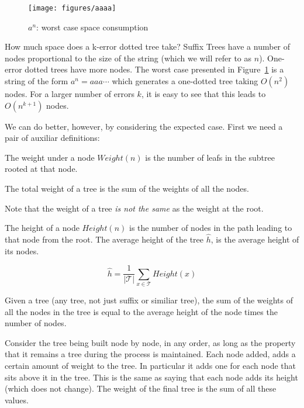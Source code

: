 \begin{figure}
\texttt{[image: figures/aaaa]}
\caption{$a^n$: worst case space consumption}%
\label{fig:aaaa}
\end{figure}

How much space does a k-error dotted tree take? Suffix Trees have a number of nodes proportional to the size of the string (which we will refer to as $n$). One-error dotted trees have more nodes. The worst case presented in Figure~\ref{fig:aaaa} is a string of the form $a^n = aaa\cdots$ which generates a one-dotted tree taking $O(n^2)$ nodes. For a larger number of errors $k$, it is easy to see that this leads to $O(n^{k+1})$ nodes.

We can do better, however, by considering the expected case. First we need a pair of auxiliar definitions:

\begin{definition}
The weight under a node $\mathit{Weight}(n)$ is the number of leafs in the subtree rooted at that node.

The total weight of a tree is the sum of the weights of all the nodes.
\end{definition}

Note that the weight of a tree \emph{is not the same} as the weight at the root.

\begin{definition}
The height of a node $\mathit{Height}(n)$ is the number of nodes in the path leading to that node from the root. The average height of the tree $\hat{h}$, is the average height of its nodes.

\[ \hat{h} = \frac{1}{|\mathcal{T}|} \sum_{x \in \mathit{\mathcal{T}}} \mathit{Height}(x) \]
\end{definition}

\begin{lemma}
Given a tree (any tree, not just suffix or similiar tree), the sum of the weights of all the nodes in the tree is equal to the average height of the node times the number of nodes.
\end{lemma}

Consider the tree being built node by node, in any order, as long as the property that it remains a tree during the process is maintained. Each node added, adds a certain amount of weight to the tree. In particular it adds one for each node that sits above it in the tree. This is the same as saying that each node adds its height (which does not change). The weight of the final tree is the sum of all these values.

